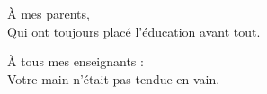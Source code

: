 
\thispagestyle{empty}


\vspace*{3cm}


\bigskip

\begin{center}
    \`A mes parents, \\ \smallskip
    Qui ont toujours plac\'e l'\'education avant tout.

    \bigskip

    \`A tous mes enseignants : \\
    Votre main n'\'etait pas tendue en vain.
\end{center}
